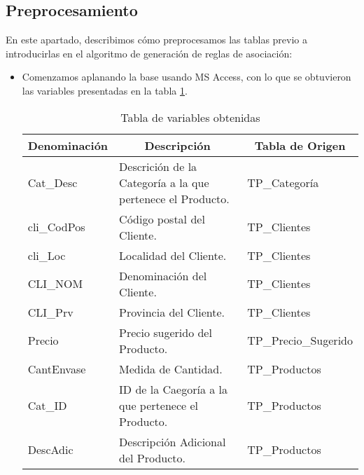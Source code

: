\documentclass[]{article}
\begin{document}
	\subsection{Preprocesamiento}
	En este apartado, describimos cómo preprocesamos las tablas previo a introducirlas en el algoritmo de generación de reglas de asociación:
	\begin{itemize}
		\item Comenzamos aplanando la base usando MS Access, con lo que se obtuvieron las variables presentadas en la tabla \ref{TablaVariables}.
		
		\begin{table}[]
			\centering
			\caption{Tabla de variables obtenidas}
			\label{TablaVariables}
			\begin{tabular}{lll}
				\multicolumn{1}{c}{{\bf Denominación}} & \multicolumn{1}{c}{{\bf Descripción}}                           & \multicolumn{1}{c}{{\bf Tabla de Origen}} \\
				\hline
				Cat\_Desc                              & Descrición de la Categoría a la que pertenece el Producto.      & TP\_Categoría                             \\
				cli\_CodPos                            & Código postal del Cliente.                                      & TP\_Clientes                              \\
				cli\_Loc                               & Localidad del Cliente.                                          & TP\_Clientes                              \\
				CLI\_NOM                               & Denominación del Cliente.                                       & TP\_Clientes                              \\
				CLI\_Prv                               & Provincia del Cliente.                                          & TP\_Clientes                              \\
				Precio                                 & Precio sugerido del Producto.                                   & TP\_Precio\_Sugerido                      \\
				CantEnvase                             & Medida de Cantidad.                                             & TP\_Productos                             \\
				Cat\_ID                                & ID de la Caegoría a la que pertenece el Producto.               & TP\_Productos                             \\
				DescAdic                               & Descripción Adicional del Producto.                             & TP\_Productos                             \\

\end{tabular}
\end{table}
\end{itemize}
\end{document}
